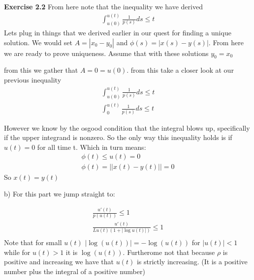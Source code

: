 \documentclass[12pt]{article}
\newenvironment{exercise}[1]{\vspace{.1in}\noindent\textbf{Exercise #1 \hspace{.05em}}}{}
\begin{document}
\begin{exercise}{2.2}
	From here note that the inequality we have derived
	\begin{align}
		\int_{u(0)}^{u(t)} \frac{1}{p(s)}ds\leq t
	\end{align}
	Lets plug in things that we derived earlier in our quest for finding a unique solution. We would set $A=|x_0-y_0|$ and $\phi(s)=|x(s)-y(s)|$.  From here we are ready to prove uniqueness. Assume that with these solutions $y_0=x_0$

	from this we gather that $A=0=u(0)$.  from this take a closer look at our previous inequality
	\begin{align}
		\int_{u(0)}^{u(t)} \frac{1}{p(s)}ds\leq t \\
		\int_{0}^{u(t)} \frac{1}{p(s)}ds\leq t
	\end{align}

	However we know by the osgood condition that the integral blows up, specifically if the upper integrand is nonzero. So the only way this inequality holds is if $u(t)=0$ for all time t. Which in turn means:
	\begin{align}
		\phi(t)\leq u(t)=0 \\
		\phi(t)=||x(t)-y(t)||=0
	\end{align}
	So $x(t)=y(t)$


	b) For this part we jump straight to:

	\begin{align}
		\frac{u'(t)}{p(u(t))}\leq 1              \\
		\frac{u'(t)}{Lu(t)(1+|\log u(t)|)}\leq 1 \\
	\end{align}
	Note that for small $u(t)$ $|\log(u(t))|=-\log(u(t))$ for $|u(t)|<1$ while for $u(t)>1$ it is $\log(u(t))$. Furtherome not that because $\rho$ is positive and increasing we have that $u(t)$ is strictly increasing. (It is a positive number plus the integral of a positive number)


\end{exercise}
\end{document}
